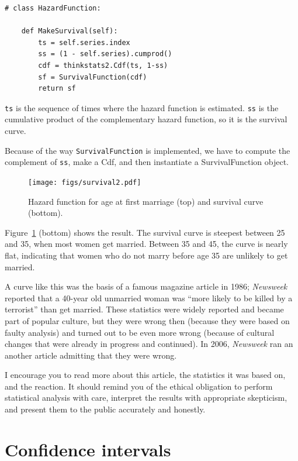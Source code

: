 \documentclass[12pt]{book}
\theoremstyle{exercise}
\begin{document}
\begin{verbatim}
# class HazardFunction:

    def MakeSurvival(self):
        ts = self.series.index
        ss = (1 - self.series).cumprod()
        cdf = thinkstats2.Cdf(ts, 1-ss)
        sf = SurvivalFunction(cdf)
        return sf
\end{verbatim}

{\tt ts} is the sequence of times where the hazard function is
estimated.  {\tt ss} is the cumulative product of the complementary
hazard function, so it is the survival curve.

Because of the way {\tt SurvivalFunction} is implemented, we have
to compute the complement of {\tt ss}, make a Cdf, and then instantiate
a SurvivalFunction object.%
%


\begin{figure}
\centerline{\texttt{[image: figs/survival2.pdf]}}
\caption{Hazard function for age at first marriage (top) and
survival curve (bottom).}%
\label{survival2}
\end{figure}

Figure~\ref{survival2} (bottom) shows the result.  The survival
curve is steepest between 25 and 35, when most women get married.
Between 35 and 45,
the curve is nearly flat, indicating that women who do not marry
before age 35 are unlikely to get married.

A curve like this was the basis of a famous magazine article in 1986;
{\it Newsweek\/} reported that a 40-year old unmarried woman was ``more
likely to be killed by a terrorist'' than get married.  These
statistics were widely reported and became part of popular culture,
but they were wrong then (because they were based on faulty analysis)
and turned out to be even more wrong (because of cultural changes that
were already in progress and continued).  In 2006, {\it Newsweek\/} ran
an another article admitting that they were wrong.%

I encourage you to read more about this article, the statistics it was
based on, and the reaction.  It should remind you of the ethical
obligation to perform statistical analysis with care, interpret the
results with appropriate skepticism, and present them to the public
accurately and honestly.%


\section{Confidence intervals}
\end{document}
